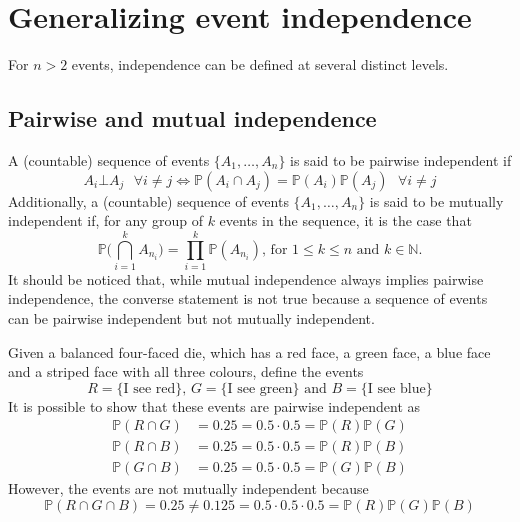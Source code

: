 \documentclass{report}
\begin{document}
\section{Generalizing event independence}
For $\displaystyle n>2$ events, independence can be defined at several distinct levels.
\subsection{Pairwise and mutual independence}
A (countable) sequence of events $\displaystyle \{A_1, \dots, A_n\}$ is said to be pairwise independent if
\[A_i \bot A_j \text{ } \forall i \neq j \Leftrightarrow \mathbb{P}(A_i \cap A_j) = \mathbb{P}(A_i)\mathbb{P}(A_j) \text{ } \forall i \neq j\]
Additionally, a (countable) sequence of events $\displaystyle \{A_1, \dots, A_n\}$ is said to be mutually independent if, for any group of $\displaystyle k$ events in the sequence, it is the case that
\[\mathbb{P}\Bigg(\bigcap_{i = 1}^k A_{n_i}\Bigg) = \prod_{i = 1}^k \mathbb{P}(A_{n_i}) \text{, for $1 \leq k \leq n$ and $k \in \mathbb{N}$.}\]
It should be noticed that, while mutual independence always implies pairwise independence, the converse statement is not true because a sequence of events can be pairwise independent but not mutually independent.
\begin{examplebox}
    Given a balanced four-faced die, which has a red face, a green face, a blue face and a striped face with all three colours, define the events
    \[R = \{\text{I see red}\} \text{, } G = \{\text{I see green}\} \text{ and } B = \{\text{I see blue}\}\]
    It is possible to show that these events are pairwise independent as
    \begin{align*}
        \mathbb{P}(R \cap G) &= 0.25 = 0.5 \cdot 0.5 = \mathbb{P}(R)\mathbb{P}(G) \\
        \mathbb{P}(R \cap B) &= 0.25 = 0.5 \cdot 0.5 = \mathbb{P}(R)\mathbb{P}(B) \\
        \mathbb{P}(G \cap B) &= 0.25 = 0.5 \cdot 0.5 = \mathbb{P}(G)\mathbb{P}(B)
    \end{align*}
    However, the events are not mutually independent because
    \[\mathbb{P}(R \cap G \cap B) = 0.25 \neq 0.125 = 0.5 \cdot 0.5 \cdot 0.5 = \mathbb{P}(R)\mathbb{P}(G)\mathbb{P}(B)\]
\end{examplebox}
\end{document}
